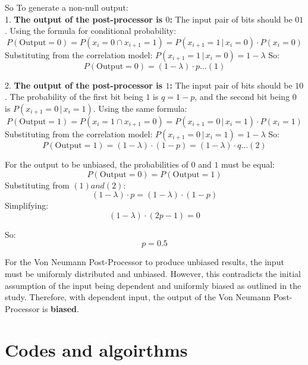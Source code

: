 \noindent So To generate a non-null output: \\ 

1. \textbf{The output of the post-processor is \( 0 \):}  
The input pair of bits should be \( 01 \). Using the formula for conditional probability:  
   \begin{equation}
   P(\text{Output} = 0) = P(x_i = 0 \cap x_{i+1} = 1) = P(x_{i+1} = 1 \,|\, x_i = 0) \cdot P(x_i = 0)
   \end{equation}  
   Substituting from the correlation model:  
   \(
   P(x_{i+1} = 1 \,|\, x_i = 0) = 1 - \lambda
   \)
   So:  
   \begin{equation}
   P(\text{Output} = 0) = (1 - \lambda) \cdot p \dots (1)
   \end{equation}  

2. \textbf{The output of the post-processor is \( 1 \):}
   The input pair of bits should be \( 10 \). The probability of the first bit being \( 1 \) is \( q = 1 - p \), and the second bit being \( 0 \) is \( P(x_{i+1} = 0 \,|\, x_i = 1) \). Using the same formula:  
   \begin{equation}
   P(\text{Output} = 1) = P(x_i = 1 \cap x_{i+1} = 0) = P(x_{i+1} = 0 \,|\, x_i = 1) \cdot P(x_i = 1)
   \end{equation}  
   Substituting from the correlation model:  
   \(
   P(x_{i+1} = 0 \,|\, x_i = 1) = 1 - \lambda
   \)  
   So:  
   \begin{equation}
   P(\text{Output} = 1) = (1-\lambda) \cdot (1 - p) = (1-\lambda) \cdot q  \dots (2)
   \end{equation}
   


   For the output to be unbiased, the probabilities of \( 0 \) and \( 1 \) must be equal:  
   \begin{equation}
   P(\text{Output} = 0) = P(\text{Output} = 1)
   \end{equation}  
   Substituting from \( (1)  and  (2): \) 
   \begin{equation}
   (1 - \lambda) \cdot p = (1-\lambda) \cdot (1 - p)
   \end{equation}  
   Simplifying:  
   \begin{equation}
   (1- \lambda) \cdot (2p-1) = 0
   \end{equation}  
   
   So:  
   \[
   p = 0.5
   \]  

For the Von Neumann Post-Processor to produce unbiased results, the input must be uniformly distributed and unbiased. However, this contradicts the initial assumption of the input being dependent and uniformly biased as outlined in the study. Therefore, with dependent input, the output of the Von Neumann Post-Processor is \textbf{biased}.

\section{Codes and algoirthms}